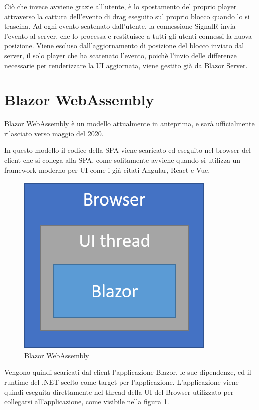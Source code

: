 Ci\`o che invece avviene grazie all'utente, \`e lo spostamento del proprio player attraverso la cattura dell'evento di drag eseguito sul proprio blocco quando lo si trascina.
Ad ogni evento scatenato dall'utente, la connessione SignalR invia l'evento al server, che lo processa e restituisce a tutti gli utenti connessi la nuova posizione.
Viene escluso dall'aggiornamento di posizione del blocco inviato dal server, il solo player che ha scatenato l'evento, poich\`e l'invio delle differenze necessarie per renderizzare la UI aggiornata, viene gestito gi\`a da Blazor Server.

\pagebreak

\section{Blazor WebAssembly}\label{sez:bwa}
Blazor WebAssembly \`e un modello attualmente in anteprima, e sar\`a ufficialmente rilasciato verso maggio del 2020.

In questo modello il codice della SPA viene scaricato ed eseguito nel browser del client che si collega alla SPA, come solitamente avviene quando si utilizza un framework moderno per UI come i gi\`a citati Angular, React e Vue.

\begin{figure}[H]
	\centerline{\includegraphics[scale=0.6]{figure/blazor-WebAssembly.png}}
	\caption{Blazor WebAssembly}
	\label{fig:BlazorWebAssembly}
\end{figure}

Vengono quindi scaricati dal client l'applicazione Blazor, le sue dipendenze, ed il runtime del .NET scelto come target per l'applicazione.
L'applicazione viene quindi eseguita direttamente nel thread della UI del Browser utilizzato per collegarsi all'applicazione, come visibile nella figura \ref{fig:BlazorWebAssembly}.

